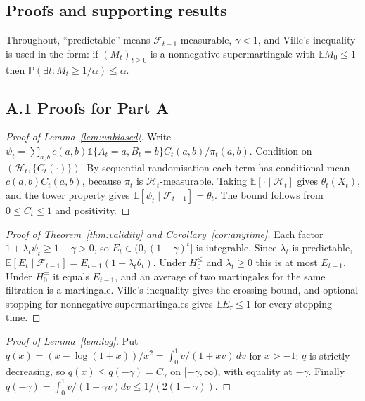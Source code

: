 \documentclass[pdflatex,sn-mathphys-ay]{sn-jnl}%
\theoremstyle{thmstyleone}%
\theoremstyle{thmstyletwo}%
\theoremstyle{thmstylethree}%
\newcommand{\E}{\mathbb{E}}
\newcommand{\Prob}{\mathbb{P}}
\newcommand{\F}{\mathcal{F}}
\newcommand{\indic}{\mathbb{1}}
\begin{document}
\begin{appendices}

\section{Proofs and supporting results}\label{secA:proofs}

Throughout, ``predictable'' means $\F_{t-1}$-measurable, $\gamma<1$, and Ville's inequality is
used in the form: if $(M_t)_{t\ge0}$ is a nonnegative supermartingale with $\E M_0\le1$ then
$\Prob(\exists t:M_t\ge1/\alpha)\le\alpha$.

\subsection*{A.1 Proofs for Part A}

\begin{proof}[Proof of Lemma~\ref{lem:unbiased}]
Write $\psi_t=\sum_{a,b}c(a,b)\indic\{A_t=a,B_t=b\}C_t(a,b)/\pi_t(a,b)$. Condition on
$(\mathcal H_t,\{C_t(\cdot)\})$. By sequential randomisation each term has conditional mean
$c(a,b)C_t(a,b)$, because $\pi_t$ is $\mathcal H_t$-measurable. Taking $\E[\cdot\mid\mathcal H_t]$ gives
$\theta_t(X_t)$, and the tower property gives $\E[\psi_t\mid\F_{t-1}]=\theta_t$. The bound follows from
$0\le C_t\le1$ and positivity.
\end{proof}

\begin{proof}[Proof of Theorem~\ref{thm:validity} and Corollary~\ref{cor:anytime}]
Each factor $1+\lambda_t\psi_t\ge1-\gamma>0$, so $E_t\in(0,(1+\gamma)^t]$ is integrable. Since $\lambda_t$ is predictable,
$\E[E_t\mid\F_{t-1}]=E_{t-1}(1+\lambda_t\theta_t)$. Under $H_0^{\le}$ and $\lambda_t\ge0$ this is at
most $E_{t-1}$. Under $H_0^{=}$ it equals $E_{t-1}$, and an average of two martingales for the
same filtration is a martingale. Ville's inequality gives the crossing bound, and optional stopping
for nonnegative supermartingales gives $\E E_\tau\le1$ for every stopping time.
\end{proof}

\begin{proof}[Proof of Lemma~\ref{lem:log}]
Put $q(x)=(x-\log(1+x))/x^2=\int_0^1v/(1+xv)\,dv$ for $x>-1$; $q$ is strictly decreasing, so
$q(x)\le q(-\gamma)=C_\gamma$ on $[-\gamma,\infty)$, with equality at $-\gamma$. Finally
$q(-\gamma)=\int_0^1v/(1-\gamma v)dv\le1/(2(1-\gamma))$.
\end{proof}


\end{appendices}
\end{document}
